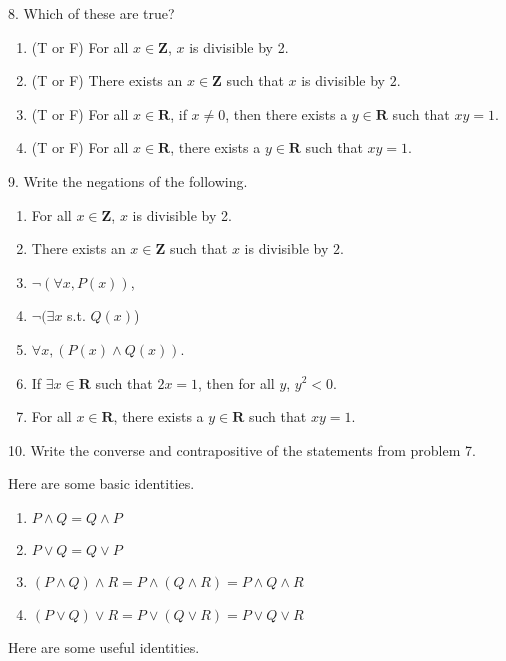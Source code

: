 \documentclass[12pt, reqno]{amsart}
\begin{document}
8. Which of these are true? 
\vspace{10pt}
\begin{enumerate}
\item (T or F) For all $x \in \mathbf{Z}$, $x$ is divisible by 2.
\item (T or F) There exists an $x \in \mathbf{Z}$ such that $x$ is divisible by $2$.
\item (T or F) For all $x \in \mathbf{R}$, if $x \neq 0$, then there exists a $y \in \mathbf{R}$ such that $xy = 1$.
\item (T or F) For all $x \in \mathbf{R}$, there exists a $y \in \mathbf{R}$ such that $xy = 1$.
\end{enumerate}
\vspace{20pt}

9. Write the negations of the following.
\vspace{10pt}
\begin{enumerate}
\item For all $x \in \mathbf{Z}$, $x$ is divisible by 2.
\item There exists an $x \in \mathbf{Z}$ such that $x$ is divisible by $2$.
\item $\neg(\forall x, P(x))$,
\item $\neg( \exists x $ s.t. $Q(x)$)
\item $\forall x, (P(x) \wedge Q(x))$.
\item If $\exists x \in \mathbf{R}$ such that $2x = 1$, then for all $y$, $y^2 < 0$.  
\item For all $x \in \mathbf{R}$, there exists a $y \in \mathbf{R}$ such that $xy = 1$.
\end{enumerate}
\vspace{20pt}

10. Write the converse and contrapositive of the statements from problem 7.


\newpage


Here are some basic identities.
\begin{enumerate}
\item $P \wedge Q = Q \wedge P$
\item $P \vee Q = Q \vee P$
\item $(P \wedge Q) \wedge R = P \wedge (Q \wedge R) = P \wedge Q \wedge R$
\item $(P \vee Q) \vee R = P \vee (Q \vee R) = P \vee Q \vee R$  
\end{enumerate}
\smallskip

Here are some useful identities.
\end{document}
